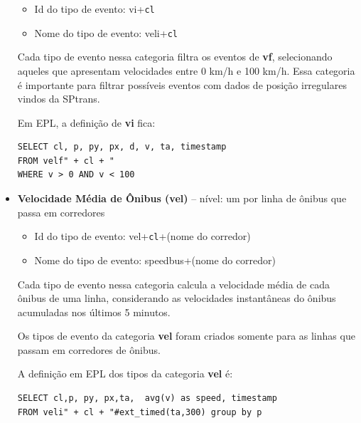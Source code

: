 \begin{itemize}
    \begin{itemize}
        \item Id do tipo de evento: vi+\texttt{cl} %
        \item Nome do tipo de evento: veli+\texttt{cl}%
    \end{itemize}
    Cada tipo de evento nessa categoria filtra os eventos de \textbf{vf}, selecionando aqueles que apresentam velocidades entre 0 km/h e 100 km/h. Essa categoria é importante para filtrar possíveis eventos com dados de posição irregulares vindos da SPtrans. 
    
    Em EPL, a definição de \textbf{vi} fica: 
\begin{verbatim}
SELECT cl, p, py, px, d, v, ta, timestamp 
FROM velf" + cl + " 
WHERE v > 0 AND v < 100
\end{verbatim}


    \item \textbf{Velocidade Média de Ônibus (vel)} -- nível: um por linha de ônibus que passa em corredores
    
    \begin{itemize}
        \item Id do tipo de evento: vel+\texttt{cl}+(nome do corredor) %
        \item Nome do tipo de evento: speedbus+(nome do corredor)
    \end{itemize}
 
    Cada tipo de evento nessa categoria calcula a velocidade média de cada ônibus de uma linha, considerando as velocidades instantâneas do ônibus acumuladas nos últimos 5 minutos. 
    
    Os tipos de evento da categoria \textbf{vel} foram criados somente para as linhas que passam em corredores de ônibus.%
    
    A definição em EPL dos tipos da categoria \textbf{vel} é:
\begin{verbatim}
SELECT cl,p, py, px,ta,  avg(v) as speed, timestamp 
FROM veli" + cl + "#ext_timed(ta,300) group by p
\end{verbatim}



\end{itemize}
